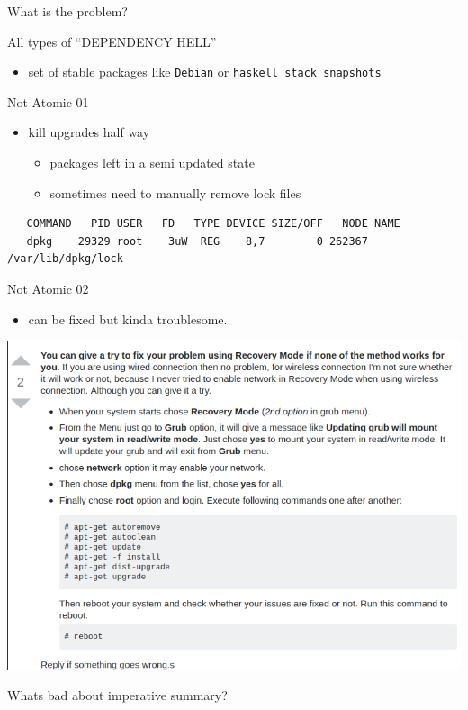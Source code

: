 \documentclass[presentation]{beamer}
\begin{document}
\begin{frame}[label={sec:org38cfab4},fragile]{What is the problem?}
\begin{block}{All types of ``DEPENDENCY HELL''}
\begin{itemize}
\begin{itemize}
\item set of stable packages like \texttt{Debian} or \texttt{haskell stack snapshots}
\end{itemize}
\end{itemize}
\end{block}
\begin{block}{Not Atomic 01}
\begin{itemize}
\item kill upgrades half way
\begin{itemize}
\item packages left in a semi updated state
\item sometimes need to manually remove lock files
\end{itemize}
\end{itemize}
\begin{verbatim}
   COMMAND   PID USER   FD   TYPE DEVICE SIZE/OFF   NODE NAME
   dpkg    29329 root    3uW  REG    8,7        0 262367 /var/lib/dpkg/lock
\end{verbatim}
\end{block}
\begin{block}{Not Atomic 02}
\begin{itemize}
\item can be fixed but kinda troublesome.
\end{itemize}
\begin{center}
\includegraphics[width=.9\linewidth]{./images/screenshot-02.png}
\end{center}
\end{block}
\begin{block}{Whats bad about imperative summary?}
\begin{itemize}

\end{itemize}
\end{block}
\end{frame}
\end{document}
